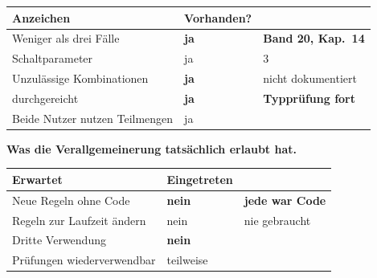 \begin{merksatz}
\begin{center}
{\small
\renewcommand{\arraystretch}{1.45}
\begin{tabular}{@{}P{3.0cm}P{2.2cm}P{2.6cm}@{}}
\toprule
\textbf{Anzeichen} & \textbf{Vorhanden?} & \\
\midrule
Weniger als drei Fälle & \textcolor{akzent}{\textbf{ja}} & \textbf{Band 20, Kap.~14}\\
Schaltparameter & \textcolor{akzent}{ja} & $3$\\
Unzulässige Kombinationen & \textcolor{akzent}{\textbf{ja}} & \textcolor{akzent}{nicht dokumentiert}\\
 durchgereicht & \textcolor{akzent}{\textbf{ja}} & \textcolor{akzent}{\textbf{Typprüfung fort}}\\
Beide Nutzer nutzen Teilmengen & \textcolor{akzent}{ja} & \\
\bottomrule
\end{tabular}}
\end{center}

\begin{center}
\begin{minipage}{0.88\textwidth}
\end{minipage}
\end{center}

\textbf{Was die Verallgemeinerung tatsächlich erlaubt hat.}

\begin{center}
\renewcommand{\arraystretch}{1.45}
\begin{tabular}{@{}P{3.0cm}P{2.2cm}P{2.6cm}@{}}
\toprule
\textbf{Erwartet} & \textbf{Eingetreten} & \\
\midrule
Neue Regeln ohne Code & \textcolor{akzent}{\textbf{nein}} & \textbf{jede war Code}\\
Regeln zur Laufzeit ändern & \textcolor{akzent}{nein} & nie gebraucht\\
Dritte Verwendung & \textcolor{akzent}{\textbf{nein}} & \\
Prüfungen wiederverwendbar & \textcolor{gruen}{teilweise} & \\
\bottomrule
\end{tabular}
\end{center}

\begin{center}
\end{center}
\end{merksatz}

